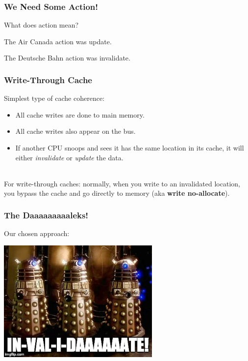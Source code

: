 \begin{frame}
\frametitle{We Need Some Action!}

What does action mean?

The Air Canada action was \alert{update}.

The Deutsche Bahn action was \alert{invalidate}.

\end{frame}


\begin{frame}
  \frametitle{Write-Through Cache}

  
Simplest type of cache coherence:
  \begin{itemize}
    \item All cache writes are done to main memory.
    \item All cache writes also appear on the bus.
    \item If another CPU snoops and sees it has the same location in
      its cache, it will either {\it invalidate} or {\it update} the
      data.
\end{itemize}
~\\

    For write-through caches: normally, when you write to an invalidated
    location, you bypass the cache and go directly to memory (aka {\bf
      write no-allocate}).

  
\end{frame}


\begin{frame}
\frametitle{The Daaaaaaaaaleks!}

Our chosen approach:

\begin{center}
\includegraphics[width=0.6\textwidth]{images/dalek-invalidate.jpg}
\end{center}

\end{frame}



